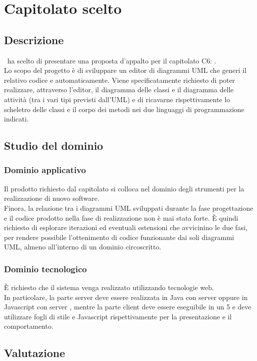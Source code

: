 \documentclass[../StudioDiFattibilita.tex]{subfiles}
\begin{document}
	\section{Capitolato scelto}
		\subsection{Descrizione}
			\kaleidoscode\ ha scelto di presentare una proposta d'appalto per il capitolato C6: \progetto.\\
			Lo scopo del progetto è di sviluppare un editor di diagrammi UML che generi il relativo codice  e
			 automaticamente.
			Viene specificatamente richiesto di poter realizzare, attraverso l'editor, il diagramma delle classi
			e il diagramma delle attività (tra i vari tipi previsti dall'UML) e di ricavarne rispettivamente lo
			scheletro delle classi e il corpo dei metodi nei due linguaggi di programmazione indicati.
		\subsection{Studio del dominio}
			\subsubsection{Dominio applicativo}
				Il prodotto richiesto dal capitolato si colloca nel dominio degli strumenti per la realizzazione
				di nuovo software.\\
				Finora, la relazione tra i diagrammi UML sviluppati durante la fase progettazione e il codice
				prodotto nella fase di realizzazione non è mai stata forte.
				È quindi richiesto di esplorare iterazioni ed eventuali estensioni che avvicinino le due fasi,
				per rendere possibile l'ottenimento di codice funzionante dai soli diagrammi UML, almeno
				all'interno di un dominio circoscritto.
			\subsubsection{Dominio tecnologico}
				È richiesto che il sistema venga realizzato utilizzando tecnologie web.\\
				In particolare, la parte server deve essere realizzata in Java con server  oppure in
				Javascript con server , mentre la parte client deve essere eseguibile in un 
				5 e deve utilizzare fogli di stile  e Javascript rispettivamente per la presentazione e il comportamento.
		\subsection{Valutazione}
\end{document}
